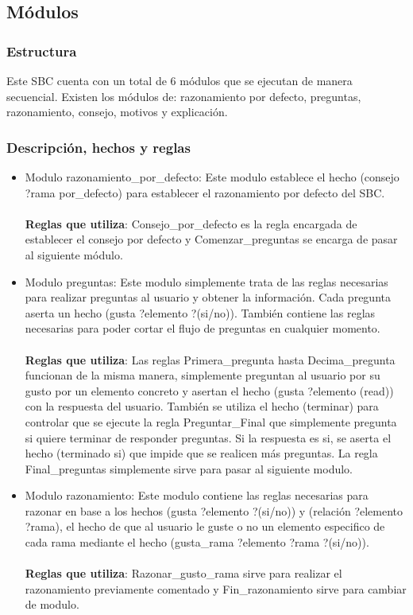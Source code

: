 \subsection{Módulos}
\subsubsection{Estructura}
Este SBC cuenta con un total de 6 módulos que se ejecutan de manera secuencial. Existen los módulos de: razonamiento por defecto, preguntas, razonamiento, consejo, motivos y explicación.

\subsubsection{Descripción, hechos y reglas}
\begin{itemize}
   \item Modulo razonamiento\_por\_defecto: Este modulo establece el hecho (consejo ?rama por\_defecto) para establecer el razonamiento por defecto del SBC.
   \\\\
   \textbf{Reglas que utiliza}: Consejo\_por\_defecto es la regla encargada de establecer el consejo por defecto y Comenzar\_preguntas se encarga de pasar al siguiente módulo.

   \item Modulo preguntas: Este modulo simplemente trata de las reglas necesarias para realizar preguntas al usuario y obtener la información. Cada pregunta aserta un hecho (gusta ?elemento ?(si/no)). También contiene las reglas necesarias para poder cortar el flujo de preguntas en cualquier momento.
   \\\\
   \textbf{Reglas que utiliza}: Las reglas Primera\_pregunta hasta Decima\_pregunta funcionan de la misma manera, simplemente preguntan al usuario por su gusto por un elemento concreto y asertan el hecho (gusta ?elemento (read)) con la respuesta del usuario. También se utiliza el hecho (terminar) para controlar que se ejecute la regla Preguntar\_Final que simplemente pregunta si quiere terminar de responder preguntas. Si la respuesta es si, se aserta el hecho (terminado si) que impide que se realicen más preguntas. La regla Final\_preguntas simplemente sirve para pasar al siguiente modulo.

   \item Modulo razonamiento: Este modulo contiene las reglas necesarias para razonar en base a los hechos (gusta ?elemento ?(si/no)) y (relación ?elemento ?rama), el hecho de que al usuario le guste o no un elemento especifico de cada rama mediante el hecho (gusta\_rama ?elemento ?rama ?(si/no)).
   \\\\
   \textbf{Reglas que utiliza}: Razonar\_gusto\_rama sirve para realizar el razonamiento previamente comentado y Fin\_razonamiento sirve para cambiar de modulo.


\end{itemize}
